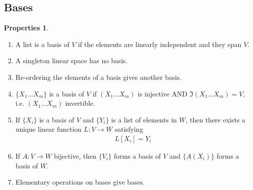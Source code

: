 \documentclass{book}
\theoremstyle{definition}
\newtheorem{prop}{Properties}[section]
\begin{document}
\subsection{Bases}
\begin{prop}
	$\,$
	\begin{enumerate}
		\item A list is a basis of $V$ if the elements are linearly independent and they span $V$.
		\item A singleton linear space has no basis.
		\item Re-ordering the elements of a basis gives another basis.
		\item $\{X_1\dots X_m\}$ is a basis of $V$ if $(X_1\dots X_m)$ is injective AND $\Im(X_1\dots X_m) = V$, i.e. $(X_1\dots X_m)$ invertible.
		\item If $\{X_i\}$ is a basis of $V$ and $\{Y_i \}$ is a list of elements in $W$, then there exists a unique linear function $L : V \rightarrow W$ satisfying 
		\begin{align*}
		L[X_i] = Y_i
		\end{align*} 
		\item If $A: V \rightarrow W$ bijective, then $\{ V_i \}$ forms a basis of $V$ and $\{A(X_i) \}$ forms a basis of $W$.
		\item Elementary operations on bases give bases.  
	\end{enumerate}
\end{prop}
\end{document}
